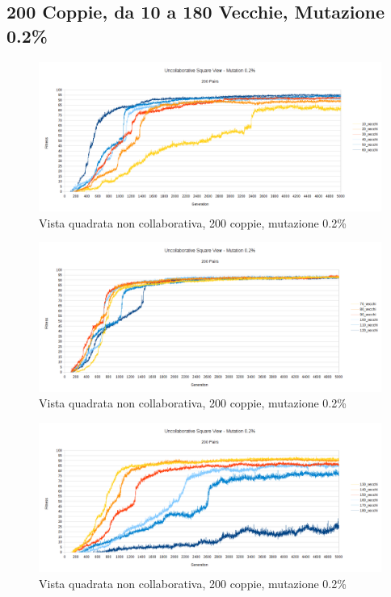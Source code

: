 \subsection{200 Coppie, da 10 a 180 Vecchie, Mutazione 0.2\%}
\begin{figure}[ht]
	\centering
	\includegraphics[scale=0.7,angle=90]{imgs/uncollaborative_square_200_pairs_10_60_vecchi_02_mutazione.png}
	\caption{Vista quadrata non collaborativa, 200 coppie, mutazione 0.2\%}
	\label{figure:uncoll_square_200_10_70_vecchi_non_mutati_02}
\end{figure}
\begin{figure}[ht]
	\centering
	\includegraphics[scale=0.7,angle=90]{imgs/uncollaborative_square_200_pairs_70_120_vecchi_02_mutazione.png}
	\caption{Vista quadrata non collaborativa, 200 coppie, mutazione 0.2\%}
	\label{figure:uncoll_square_200_70_120_vecchi_non_mutati_02}
\end{figure}
\begin{figure}[ht]
	\centering
	\includegraphics[scale=0.7,angle=90]{imgs/uncollaborative_square_200_pairs_130_180_vecchi_02_mutazione.png}
	\caption{Vista quadrata non collaborativa, 200 coppie, mutazione 0.2\%}
	\label{figure:uncoll_square_200_130_180_vecchi_non_mutati_02}
\end{figure}
